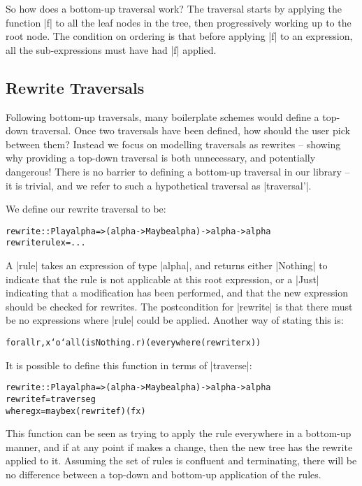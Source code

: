 \documentclass[preprint]{sigplanconf}
\newenvironment{code}{\begin{alltt}\small}{\end{alltt}}
\begin{document}
So how does a bottom-up traversal work? The traversal starts by applying the function |f| to all the leaf nodes in the tree, then progressively working up to the root node. The condition on ordering is that before applying |f| to an expression, all the sub-expressions must have had |f| applied.

\subsection{Rewrite Traversals}

Following bottom-up traversals, many boilerplate schemes would define a top-down traversal. Once two traversals have been defined, how should the user pick between them? Instead we focus on modelling traversals as rewrites -- showing why providing a top-down traversal is both unnecessary, and potentially dangerous! There is no barrier to defining a bottom-up traversal in our library -- it is trivial, and we refer to such a hypothetical traversal as |traversal'|.

We define our rewrite traversal to be:

\begin{code}
rewrite :: Play alpha => (alpha -> Maybe alpha) -> alpha -> alpha
rewrite rule x = ...
\end{code}

A |rule| takes an expression of type |alpha|, and returns either |Nothing| to indicate that the rule is not applicable at this root expression, or a |Just| indicating that a modification has been performed, and that the new expression should be checked for rewrites. The postcondition for |rewrite| is that there must be no expressions where |rule| could be applied. Another way of stating this is:

\begin{code}
forall r, x `o` all (isNothing . r) (everywhere (rewrite r x))
\end{code}

It is possible to define this function in terms of |traverse|:

\begin{code}
rewrite :: Play alpha => (alpha -> Maybe alpha) -> alpha -> alpha
rewrite f = traverse g
    where g x = maybe x (rewrite f) (f x)
\end{code}

This function can be seen as trying to apply the rule everywhere in a bottom-up manner, and if at any point if makes a change, then the new tree has the rewrite applied to it. Assuming the set of rules is confluent and terminating, there will be no difference between a top-down and bottom-up application of the rules.
\end{document}
